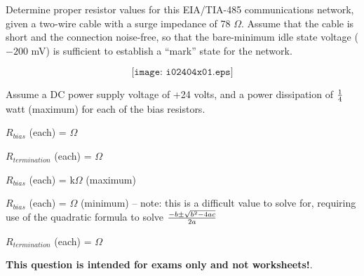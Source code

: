 

Determine proper resistor values for this EIA/TIA-485 communications network, given a two-wire cable with a surge impedance of 78 $\Omega$.  Assume that the cable is short and the connection noise-free, so that the bare-minimum idle state voltage ($-200$ mV) is sufficient to establish a ``mark'' state for the network.

$$\texttt{[image: i02404x01.eps]}$$

Assume a DC power supply voltage of +24 volts, and a power dissipation of $1 \over 4$ watt (maximum) for each of the bias resistors.

\vskip 10pt

$R_{bias}$ (each) = \underbar{\hskip 50pt} $\Omega$

\vskip 10pt

$R_{termination}$ (each) = \underbar{\hskip 50pt} $\Omega$







$R_{bias}$ (each) =  k$\Omega$ (maximum)

$R_{bias}$ (each) =  $\Omega$ (minimum) -- note: this is a difficult value to solve for, requiring use of the quadratic formula to solve ${-b \pm \sqrt{b^2 - 4ac}} \over 2a$

\vskip 10pt

$R_{termination}$ (each) =  $\Omega$







{\bf This question is intended for exams only and not worksheets!}.




